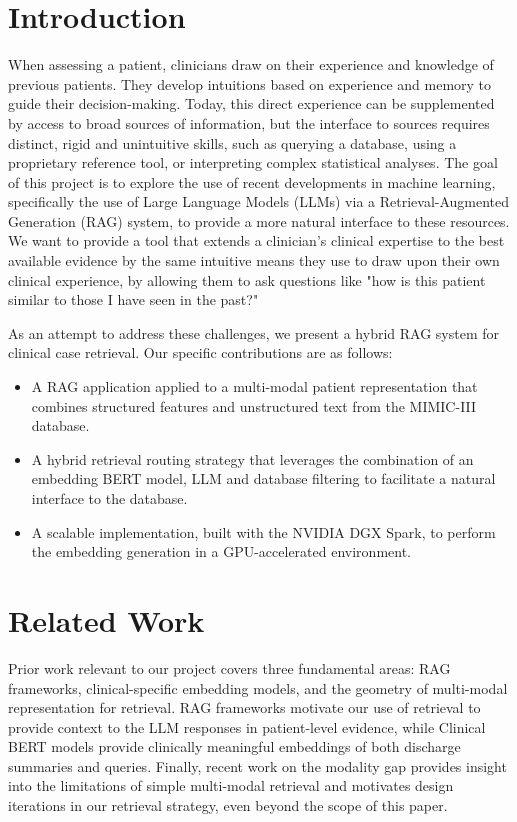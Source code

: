 \documentclass[acmtog]{acmart}
\begin{document}
\section{Introduction}
When assessing a patient, clinicians draw on their experience and knowledge of previous patients. They develop intuitions based on experience and memory to guide their decision-making. Today, this direct experience can be supplemented by access to broad sources of information, but the interface to sources requires distinct, rigid and unintuitive skills, such as querying a database, using a proprietary reference tool, or interpreting complex statistical analyses. The goal of this project is to explore the use of recent developments in machine learning, specifically the use of Large Language Models (LLMs) via a Retrieval-Augmented Generation (RAG) system, to provide a more natural interface to these resources. We want to provide a tool that extends a clinician's clinical expertise to the best available evidence by the same intuitive means they use to draw upon their own clinical experience, by allowing them to ask questions like "how is this patient similar to those I have seen in the past?"

As an attempt to address these challenges, we present a hybrid RAG system for clinical case retrieval. Our specific contributions are as follows:

\begin{itemize}
  \item A RAG application applied to a multi-modal patient representation that combines structured features and unstructured text from the MIMIC-III database.
  \item A hybrid retrieval routing strategy that leverages the combination of an embedding BERT model, LLM and database filtering to facilitate a natural interface to the database.
  \item A scalable implementation, built with the NVIDIA DGX Spark, to perform the embedding generation in a GPU-accelerated environment.
\end{itemize}

\section{Related Work}
Prior work relevant to our project covers three fundamental areas: RAG frameworks, clinical-specific embedding models, and the geometry of multi-modal representation for retrieval. RAG frameworks motivate our use of retrieval to provide context to the LLM responses in patient-level evidence, while Clinical BERT models provide clinically meaningful embeddings of both discharge summaries and queries. Finally, recent work on the modality gap provides insight into the limitations of simple multi-modal retrieval and motivates design iterations in our retrieval strategy, even beyond the scope of this paper.
\end{document}
